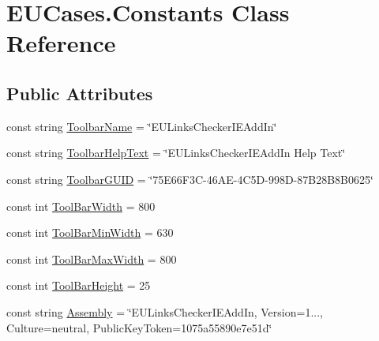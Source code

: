 \hypertarget{class_e_u_cases_1_1_constants}{\section{E\+U\+Cases.\+Constants Class Reference}
\label{class_e_u_cases_1_1_constants}
}
\subsection*{Public Attributes}
\begin{DoxyCompactItemize}
\item 
const string \hyperlink{class_e_u_cases_1_1_constants_af27bcb7d9455c17ad60b337e3649d7e2}{Toolbar\+Name} = \char`\"{}E\+U\+Links\+Checker\+I\+E\+Add\+In\char`\"{}
\item 
const string \hyperlink{class_e_u_cases_1_1_constants_a607db4405898fbbbea14415c5bd3814d}{Toolbar\+Help\+Text} = \char`\"{}E\+U\+Links\+Checker\+I\+E\+Add\+In Help Text\char`\"{}
\item 
const string \hyperlink{class_e_u_cases_1_1_constants_a982187f9c0faae3b5cc660b59b8fd03e}{Toolbar\+G\+U\+I\+D} = \char`\"{}75\+E66\+F3\+C-\/46\+A\+E-\/4\+C5\+D-\/998\+D-\/87\+B28\+B8\+B0625\char`\"{}
\item 
const int \hyperlink{class_e_u_cases_1_1_constants_acda8b45209ecc2b689fec9da7181595e}{Tool\+Bar\+Width} = 800
\item 
const int \hyperlink{class_e_u_cases_1_1_constants_a890854b577bb94dc5fee9ae0026478ea}{Tool\+Bar\+Min\+Width} = 630
\item 
const int \hyperlink{class_e_u_cases_1_1_constants_a798f400e8de0d31efeb32760c6919f8f}{Tool\+Bar\+Max\+Width} = 800
\item 
const int \hyperlink{class_e_u_cases_1_1_constants_a712b032ba1697ccec5340ed1227f3643}{Tool\+Bar\+Height} = 25
\item 
const string \hyperlink{class_e_u_cases_1_1_constants_acda121e2c24e81e72efee79f53e601cf}{Assembly} = \char`\"{}E\+U\+Links\+Checker\+I\+E\+Add\+In, Version=1..., Culture=neutral, Public\+Key\+Token=1075a55890e7e51d\char`\"{}
\end{DoxyCompactItemize}


